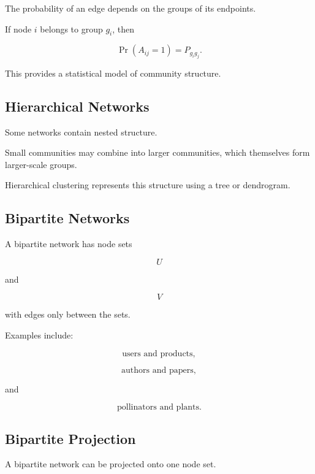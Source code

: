 The probability of an edge depends on the groups of its endpoints.

If node \(i\) belongs to group \(g_i\), then

\[
\boxed{
\Pr(A_{ij}=1)
=
P_{g_i g_j}.
}
\]

This provides a statistical model of community structure.

\subsection{Hierarchical Networks}
\label{subsec:hierarchical-networks}

Some networks contain nested structure.

Small communities may combine into larger communities, which themselves form
larger-scale groups.

Hierarchical clustering represents this structure using a tree or
dendrogram.

\subsection{Bipartite Networks}
\label{subsec:bipartite-networks}

A bipartite network has node sets

\[
\boxed{
U
}
\]

and

\[
\boxed{
V
}
\]

with edges only between the sets.

Examples include:

\[
\boxed{
\text{users and products},
}
\]

\[
\boxed{
\text{authors and papers},
}
\]

and

\[
\boxed{
\text{pollinators and plants}.
}
\]

\subsection{Bipartite Projection}
\label{subsec:bipartite-projection}

A bipartite network can be projected onto one node set.

